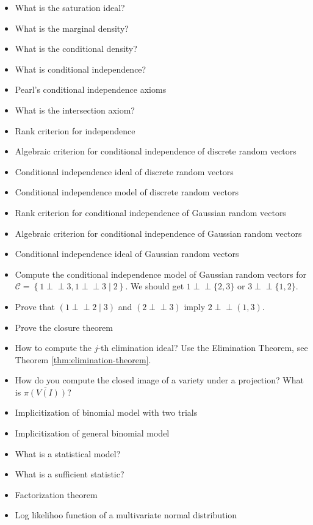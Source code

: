 \documentclass[a4paper, 11pt]{article}
\newcommand{\indep}{\perp \!\!\! \perp}
\begin{document}
\begin{itemize}
  \item What is the saturation ideal?
  \item What is the marginal density? 
  \item What is the conditional density?
  \item What is conditional independence?
  \item Pearl's conditional independence axioms
  \item What is the intersection axiom?
  \item Rank criterion for independence
  \item Algebraic criterion for conditional independence of discrete random vectors
  \item Conditional independence ideal of discrete random vectors
  \item Conditional independence model of discrete random vectors
  \item Rank criterion for conditional independence of Gaussian random vectors
  \item Algebraic criterion for conditional independence of Gaussian random vectors
  \item Conditional independence ideal of Gaussian random vectors
  \item Compute the conditional independence model of Gaussian random vectors for \( \mathcal{C} = \left\{ 1 \indep 3, 1 \indep 3 \mid 2 \right\} \). We should get \( 1 \indep \{2,3\} \) or \( 3 \indep \{1,2\} \).
  \item Prove that \( (1 \indep 2 \mid 3) \) and \( (2 \indep 3) \) imply \( 2 \indep (1,3) \).
  \item Prove the closure theorem
  \item How to compute the \( j \)-th elimination ideal? Use the Elimination Theorem, see Theorem \ref{thm:elimination-theorem}.
  \item How do you compute the closed image of a variety under a projection? What is \( \overline{\pi(V(I))} \)?
  \item Implicitization of binomial model with two trials
  \item Implicitization of general binomial model 
  \item What is a statistical model?
  \item What is a sufficient statistic?
  \item Factorization theorem
  \item Log likelihoo function of a multivariate normal distribution

\end{itemize}
\end{document}
